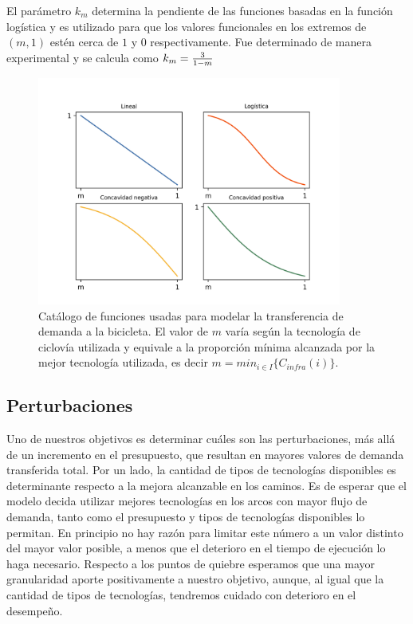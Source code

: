 El parámetro $k_m$ determina la pendiente de las funciones basadas en la función logística y es utilizado para que los valores funcionales en los extremos de $(m, 1)$ estén cerca de $1$ y $0$ respectivamente. Fue determinado de manera experimental y se calcula como $k_m = {3 \over 1 - m}$

\begin{figure}[h!]
  \centering
  \includegraphics[width=10cm]{../resources/f_catalog.png}
    \caption{Catálogo de funciones usadas para modelar la transferencia de demanda a la bicicleta. El valor de $m$ varía según la tecnología de ciclovía utilizada y equivale a la proporción mínima alcanzada por la mejor tecnología utilizada, es decir $m = min_{i \in I} \{ C_{infra}(i) \}$.}
  \label{fig:fcatalog}
\end{figure}

\FloatBarrier
\subsection{Perturbaciones}

Uno de nuestros objetivos es determinar cuáles son las perturbaciones, más allá de un incremento en el presupuesto, que resultan en mayores valores de demanda transferida total. Por un lado, la cantidad de tipos de tecnologías disponibles es determinante respecto a la mejora alcanzable en los caminos. Es de esperar que el modelo decida utilizar mejores tecnologías en los arcos con mayor flujo de demanda, tanto como el presupuesto y tipos de tecnologías disponibles lo permitan. En principio no hay razón para limitar este número a un valor distinto del mayor valor posible, a menos que el deterioro en el tiempo de ejecución lo haga necesario. Respecto a los puntos de quiebre esperamos que una mayor granularidad aporte positivamente a nuestro objetivo, aunque, al igual que la cantidad de tipos de tecnologías, tendremos cuidado con deterioro en el desempeño.

